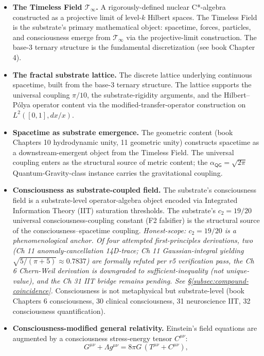 \documentclass[11pt,a4paper]{amsart}
\theoremstyle{plain}
\theoremstyle{definition}
\begin{document}
\begin{itemize}[itemsep=4pt,leftmargin=2em]
\item \textbf{The Timeless Field $\mathcal{T}_\infty$.} A rigorously-defined nuclear C*-algebra constructed as a projective limit of level-$k$ Hilbert spaces. The Timeless Field is the substrate's primary mathematical object: spacetime, forces, particles, and consciousness emerge from $\mathcal{T}_\infty$ via the projective-limit construction. The base-3 ternary structure is the fundamental discretization (see book Chapter 4).
\item \textbf{The fractal substrate lattice.} The discrete lattice underlying continuous spacetime, built from the base-3 ternary structure. The lattice supports the universal coupling $\pi/10$, the substrate-rigidity arguments, and the Hilbert--P\'olya operator content via the modified-transfer-operator construction on $L^2([0,1], dx/x)$.
\item \textbf{Spacetime as substrate emergence.} The geometric content (book Chapters 10 hydrodynamic unity, 11 geometric unity) constructs spacetime as a downstream-emergent object from the Timeless Field. The universal coupling enters as the structural source of metric content; the $\alpha_{\textsf{QG}} = \sqrt{2\pi}$ Quantum-Gravity-class instance carries the gravitational coupling.
\item \textbf{Consciousness as substrate-coupled field.} The substrate's consciousness field is a substrate-level operator-algebra object encoded via Integrated Information Theory (IIT) saturation thresholds. The substrate's $c_2 = 19/20$ universal consciousness-coupling constant (F2 falsifier) is the structural source of the consciousness--spacetime coupling. \emph{Honest-scope: $c_2 = 19/20$ is a phenomenological anchor. Of four attempted first-principles derivations, two (Ch 11 anomaly-cancellation 14D-trace; Ch 11 Gaussian-integral yielding $\sqrt{5/(\pi+5)} \approx 0.7837$) are formally refuted per r5 verification pass, the Ch 6 Chern-Weil derivation is downgraded to sufficient-inequality (not unique-value), and the Ch 31 IIT bridge remains pending. See \S\ref{subsec:compound-coincidence}.} Consciousness is not metaphysical but substrate-level (book Chapters 6 consciousness, 30 clinical consciousness, 31 neuroscience IIT, 32 consciousness quantification).
\item \textbf{Consciousness-modified general relativity.} Einstein's field equations are augmented by a consciousness stress-energy tensor $C^{\mu\nu}$:
\[
G^{\mu\nu} + \Lambda g^{\mu\nu} = 8\pi G\,(T^{\mu\nu} + C^{\mu\nu}),
\]
\end{itemize}
\end{document}
